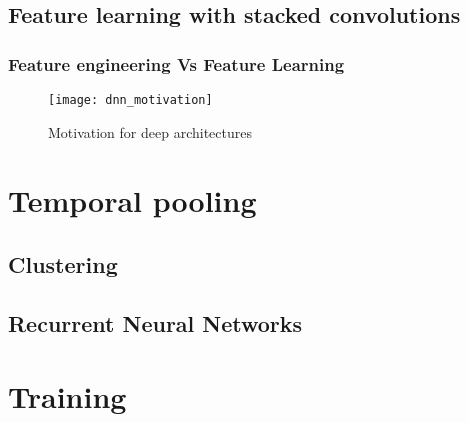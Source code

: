 {\color{gray}
\subsection{Feature learning with stacked convolutions}
\label{stacked}

\subsubsection{Feature engineering Vs Feature Learning}
\label{feature}

\begin{figure}[h] 
\centering
\texttt{[image: dnn\_motivation]}
\caption{Motivation for deep architectures}
 \label{fig:deep learning}
 \end{figure}
\FloatBarrier
\bigskip

\section{Temporal pooling}
\label{temporal}
\subsection{Clustering}
\label{clustering}
\subsection{Recurrent Neural Networks}
\label{rnn}

\section{Training}
\label{training}
}
